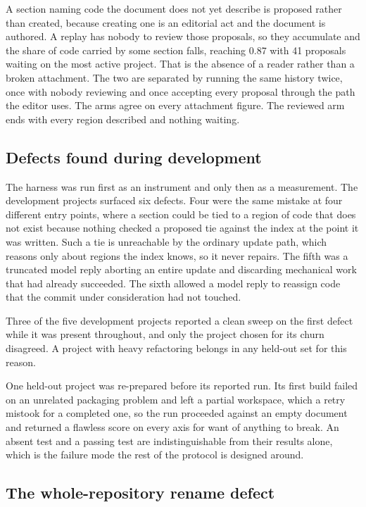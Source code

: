 A section naming code the document does not yet describe is proposed rather than created, because creating one is an editorial act and the document is authored. A replay has nobody to review those proposals, so they accumulate and the share of code carried by some section falls, reaching 0.87 with 41 proposals waiting on the most active project. That is the absence of a reader rather than a broken attachment. The two are separated by running the same history twice, once with nobody reviewing and once accepting every proposal through the path the editor uses. The arms agree on every attachment figure. The reviewed arm ends with every region described and nothing waiting.

\subsection{Defects found during development}
\label{app:attachment-defects}

The harness was run first as an instrument and only then as a measurement. The development projects surfaced six defects. Four were the same mistake at four different entry points, where a section could be tied to a region of code that does not exist because nothing checked a proposed tie against the index at the point it was written. Such a tie is unreachable by the ordinary update path, which reasons only about regions the index knows, so it never repairs. The fifth was a truncated model reply aborting an entire update and discarding mechanical work that had already succeeded. The sixth allowed a model reply to reassign code that the commit under consideration had not touched.

Three of the five development projects reported a clean sweep on the first defect while it was present throughout, and only the project chosen for its churn disagreed. A project with heavy refactoring belongs in any held-out set for this reason.

One held-out project was re-prepared before its reported run. Its first build failed on an unrelated packaging problem and left a partial workspace, which a retry mistook for a completed one, so the run proceeded against an empty document and returned a flawless score on every axis for want of anything to break. An absent test and a passing test are indistinguishable from their results alone, which is the failure mode the rest of the protocol is designed around.

\subsection{The whole-repository rename defect}
\label{app:rename}


